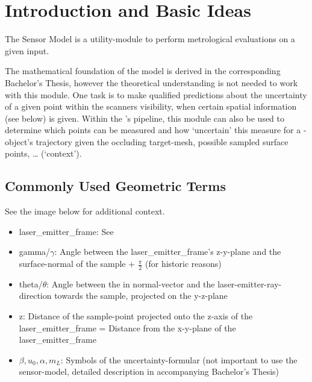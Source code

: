 \documentclass[letterpaper,10pt,english]{sphinxmanual}
\begin{document}
\section{Introduction and Basic Ideas}
\label{\detokenize{module_sensor_model:introduction-and-basic-ideas}}
The Sensor Model is a utility-module to perform metrological evaluations on a given input.

The mathematical foundation of the model is derived in the corresponding
Bachelor’s Thesis, however the theoretical understanding is not needed to work with this module. One task is to make qualified predictions about the uncertainty
of a given point within the scanners visibility, when certain spatial information (see below) is given. Within the {\hyperref[\detokenize{module_trajectory_manager:trajectory-manager}]{}}’s pipeline, this module
can also be used to determine which points can be measured and how ‘uncertain’ this measure for a {\hyperref[\detokenize{module_view:view}]{}}-object’s trajectory given the occluding target-mesh,
possible sampled surface points, … (‘context’).


\subsection{Commonly Used Geometric Terms}
\label{\detokenize{module_sensor_model:commonly-used-geometric-terms}}
See the image below for additional context.
\begin{itemize}
\item {} 
laser\_emitter\_frame: See {\hyperref[\detokenize{module_view:view}]{}}

\item {} 
gamma/\(\gamma\): Angle between the laser\_emitter\_frame’s z-y-plane and the surface-normal of the sample + \(\frac{\pi}{2}\) (for historic reasons)

\item {} 
theta/\(\theta\):  Angle between the in normal-vector and the laser-emitter-ray-direction towards the sample, projected on the y-z-plane

\item {} 
z: Distance of the sample-point projected onto the z-axis of the laser\_emitter\_frame = Distance from the x-y-plane of the laser\_emitter\_frame

\item {} 
\(\beta, u_{0}, \alpha, m_{L}\): Symbols of the uncertainty-formular (not important to use the sensor-model, detailed description in accompanying Bachelor’s Thesis)

\end{itemize}
\end{document}

